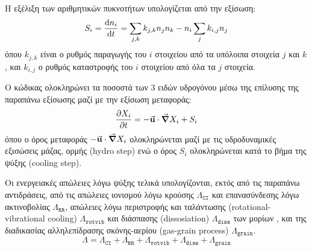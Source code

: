 	Η εξέλιξη των αριθμητικών πυκνοτήτων υπολογίζεται από την εξίσωση:
	\begin{equation}
	S_i=\dv{n_i}{t}=\sum\limits_{j,k}k_{j,k}n_j n_k - n_i \sum_{j}k_{i,j}n_j
	\end{equation}
	όπου $k_{j,k}$ είναι ο ρυθμός παραγωγής του $i$ στοιχείου από τα υπόλοιπα στοιχεία $j$ και $k$, και $k_{i,j}$ ο ρυθμός καταστροφής του $i$ στοιχείου από όλα τα $j$ στοιχεία.
	
	Ο κώδικας ολοκληρώνει τα ποσοστά των 3 ειδών υδρογόνου μέσω της επίλυσης της παραπάνω εξίσωσης μαζί με την εξίσωση μεταφοράς:
	\begin{equation}
	\pdv{X_i}{t}=-\va{u}\cdot \grad{X_i}+S_i
	\end{equation}
	όπου ο όρος μεταφοράς $-\va{u}\cdot \grad{X_i}$ ολοκληρώνεται μαζί με τις υδροδυναμικές εξισώσεις μάζας, ορμής (hydro step) ενώ ο όρος $S_i$ ολοκληρώνεται κατά το βήμα της ψύξης (cooling step).
	



	
	Οι ενεργειακές απώλειες λόγω ψύξης τελικά υπολογίζονται, εκτός από τις παραπάνω αντιδράσεις, από τις απώλειες ιονισμού λόγω κρούσης $\Lambda _{\mathtt{CI}}$ και επανασύνδεσης λόγω ακτινοβολίας $\Lambda _{\mathtt{RR}}$, απώλειες λόγω περιστροφής και ταλάντωσης (rotational-vibrational cooling) $\Lambda _{\mathtt{rotvib}}$ και διάσπασης (dissosiation) $\Lambda _{\mathtt{diss}}$ των μορίων , και της διαδικασίας αλληλεπίδρασης σκόνης-αερίου (gas-grain process) $\Lambda _{\mathtt{grain}}$.
	\begin{equation}
	\Lambda = \Lambda _{\mathtt{CI}} + \Lambda _{\mathtt{RR}} +\Lambda _{\mathtt{rotvib}} + \Lambda _{\mathtt{diss}} + \Lambda _{\mathtt{grain}}
	\end{equation}
	
	
